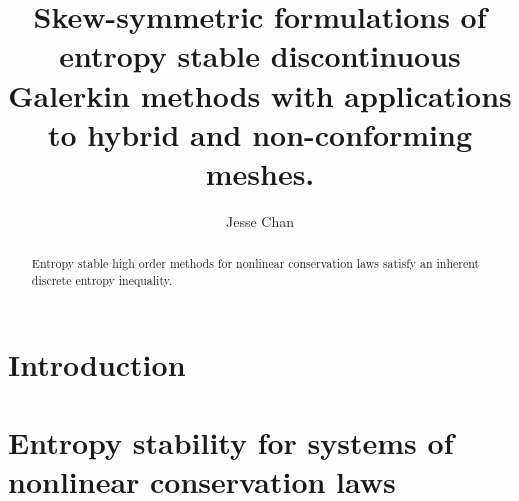 \documentclass[preprint,10pt]{elsarticle}
\theoremstyle{definition}
\theoremstyle{lemma}
\theoremstyle{corollary}
\theoremstyle{theorem}
\theoremstyle{assumption}
\begin{document}

\begin{frontmatter}
\title{Skew-symmetric formulations of entropy stable discontinuous Galerkin methods with applications to hybrid and non-conforming meshes. }

\author[rice]{Jesse Chan}
\address[rice]{Department of Computational and Applied Mathematics, Rice University, 6100 Main St, Houston, TX, 77005}

\begin{abstract}
Entropy stable high order methods for nonlinear conservation laws satisfy an inherent discrete entropy inequality.  
\end{abstract}
\end{frontmatter}


\section{Introduction}

\section{Entropy stability for systems of nonlinear conservation laws}
\end{document}
